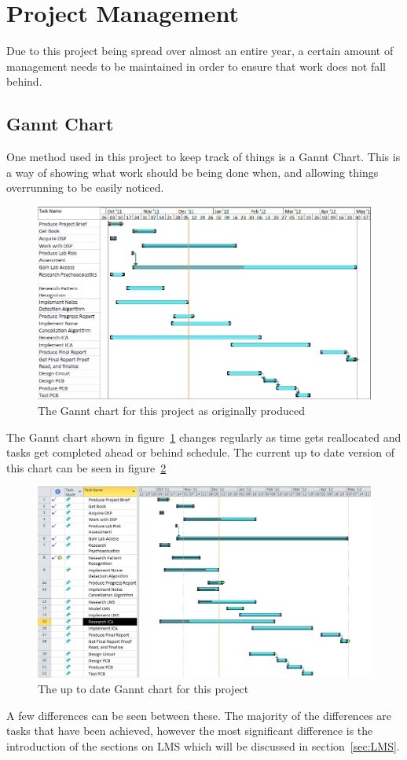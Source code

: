 \section{Project Management}
Due to this project being spread over almost an entire year, a certain amount of management needs to be maintained in order to ensure that work does not fall behind.

\subsection{Gannt Chart}
One method used in this project to keep track of things is a Gannt Chart.
This is a way of showing what work should be being done when, and allowing things overrunning to be easily noticed.

\begin{figure}
	\centering
	\includegraphics[width=\textwidth]{./img/ganntori.png}
	\caption{The Gannt chart for this project as originally produced}
	\label{fig:gannt}
\end{figure}
\noindent
The Gannt chart shown in figure~\ref{fig:gannt} changes regularly as time gets reallocated and tasks get completed ahead or behind schedule.
The current up to date version of this chart can be seen in figure~\ref{fig:newgannt}

\begin{figure}
	\centering
	\includegraphics[width=\textwidth]{./img/ganntnew.png}
	\caption{The up to date Gannt chart for this project}
	\label{fig:newgannt}
\end{figure}
\noindent
A few differences can be seen between these.
The majority of the differences are tasks that have been achieved, however the most significant difference is the introduction of the sections on LMS which will be discussed in section~\ref{sec:LMS}.

